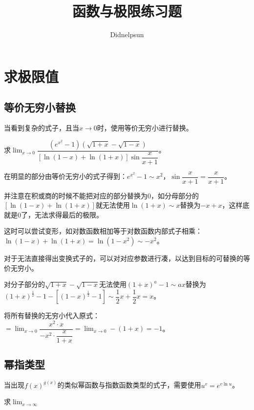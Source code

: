 \documentclass[UTF8]{ctexart}
\author{Didnelpsun}
\title{函数与极限练习题}
\date{}
\begin{document}
\maketitle
\thispagestyle{empty}
\tableofcontents
\thispagestyle{empty}
\newpage
\pagestyle{plain}
\setcounter{page}{1}

\section{求极限值}

\subsection{等价无穷小替换}

当看到复杂的式子，且当$x\to 0$时，使用等价无穷小进行替换。

求$\lim_{x\to 0}\dfrac{(e^{x^2}-1)(\sqrt{1+x}-\sqrt{1-x})}{[\ln(1-x)+\ln(1+x)]\sin\dfrac{x}{x+1}}$。

在明显的部分由等价无穷小的式子得到：$e^{x^2}-1\sim x^2$，$\sin\dfrac{x}{x+1}=\dfrac{x}{x+1}$。

并注意在积或商的时候不能把对应的部分替换为0，如分母部分的$[\ln(1-x)+\ln(1+x)]$就无法使用$\ln(1+x)\sim x$替换为$-x+x$，这样底就是0了，无法求得最后的极限。

这时可以尝试变形，如对数函数相加等于对数函数内部式子相乘：$\ln(1-x)+\ln(1+x)=\ln(1-x^2)\sim-x^2$。

对于无法直接得出变换式子的，可以对对应参数进行凑，以达到目标的可替换的等价无穷小。

对分子部分的$\sqrt{1+x}-\sqrt{1-x}$无法使用$(1+x)^a-1\sim ax$替换为$(1+x)^{\frac{1}{2}}-1-[(1-x)^{\frac{1}{2}}-1]\sim\dfrac{1}{2}x+\dfrac{1}{2}x=x$。

将所有替换的无穷小代入原式：$=\lim_{x\to 0}\dfrac{x^2\cdot x}{-x^2\cdot\dfrac{x}{1+x}}=\lim_{x\to 0}-(1+x)=-1$。

\subsection{幂指类型}

当出现$f(x)^{g(x)}$的类似幂函数与指数函数类型的式子，需要使用$u^v=e^{v\ln u}$。

求$\lim_{x\to\infty}$
\end{document}
